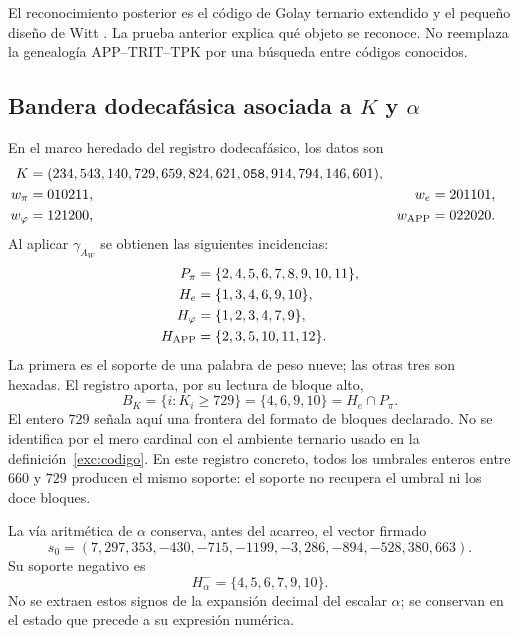 El reconocimiento posterior es el código de Golay ternario extendido y
el pequeño diseño de Witt \cite{conwaysloane}. La prueba anterior explica qué objeto se
reconoce. No reemplaza la genealogía APP--TRIT--TPK por una búsqueda
entre códigos conocidos.

\subsection{Bandera dodecafásica asociada a \texorpdfstring{$K$ y $\alpha$}{K y alfa}}
\label{exc:bandera}

En el marco heredado del registro dodecafásico, los datos son
\begin{align}
 K={}&(234,543,140,729,659,824,621,\mathtt{058},914,794,146,601),
 \label{exc:k}\\
 w_\pi={}&010211, &w_e={}&201101,\nonumber\\
 w_\varphi={}&121200, &w_{\rm APP}={}&022020.\nonumber
\end{align}
Al aplicar $\gamma_{A_W}$ se obtienen las siguientes incidencias:
\begin{align*}
 P_\pi&=\{2,4,5,6,7,8,9,10,11\},\\
 H_e&=\{1,3,4,6,9,10\},\\
 H_\varphi&=\{1,2,3,4,7,9\},\\
 H_{\rm APP}&=\{2,3,5,10,11,12\}.
\end{align*}
La primera es el soporte de una palabra de peso nueve; las otras tres
son hexadas. El registro aporta, por su lectura de bloque alto,
\begin{equation}
 B_K=\{i:K_i\geq729\}=\{4,6,9,10\}=H_e\cap P_\pi.
 \label{exc:bk}
\end{equation}
El entero $729$ señala aquí una frontera del formato de bloques
declarado. No se identifica por el mero cardinal con el ambiente
ternario usado en la definición~\ref{exc:codigo}. En este registro concreto, todos
los umbrales enteros entre $660$ y $729$ producen el mismo soporte:
el soporte no recupera el umbral ni los doce bloques.

La vía aritmética de $\alpha$ conserva, antes del acarreo, el vector
firmado
\begin{equation}
 s_0=(7,297,353,-430,-715,-1199,-3,286,-894,-528,380,663).
 \label{exc:precarry}
\end{equation}
Su soporte negativo es
\begin{equation}
 H^-_\alpha=\{4,5,6,7,9,10\}.
 \label{exc:halpha}
\end{equation}
No se extraen estos signos de la expansión decimal del escalar
$\alpha$; se conservan en el estado que precede a su expresión numérica.

